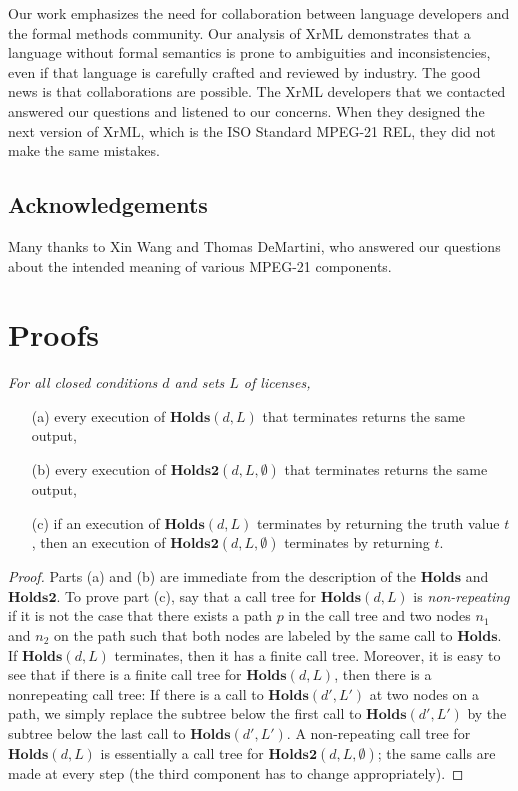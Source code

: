 \documentclass{acmtrans2m}
\newcommand{\prf}{\begin{proof}}
\newcommand{\eprf}{\end{proof}}
\newenvironment{RETHM}[2]{\trivlist \item[\hskip 10pt\hskip\labelsep{\sc #1\hskip 5pt\relax\ref{#2}.}]\it}{\endtrivlist}
\newcommand{\repro}[1]{\begin{RETHM}{Proposition}{#1}}
\newcommand{\erepro}{\end{RETHM}}
\newcommand{\opro}{\repro}
\newcommand{\eopro}{\erepro}
\newcommand{\<}{
}
\renewcommand{\>}{\rangle}
\newcommand{\cd}{d}
\newcommand{\CMet}{\textbf{Holds}}
\newcommand{\CMetTwo}{\textbf{Holds2}}
\begin{document}
Our work emphasizes the need for collaboration
between language developers and
the formal methods community.  Our analysis of XrML demonstrates that a
language without formal semantics is prone to ambiguities and inconsistencies, even if
that language is carefully crafted and reviewed by industry.  The good news is that collaborations
are possible.  The XrML developers that we contacted answered our questions and listened to our
concerns.  When they designed the next version of XrML, which is the ISO Standard MPEG-21 REL,
they did not make the same mistakes.

\subsection*{Acknowledgements}
Many thanks to Xin Wang and Thomas DeMartini, who answered our questions about the intended meaning
of various MPEG-21 components.

\appendix
\section{Proofs}
\opro{t:correct2}
For all closed conditions $\cd$ and sets $L$ of licenses,
\begin{itemize}
\item[(a)] every execution of $\CMet(\cd, L)$ that terminates returns the same output,
\item[(b)] every execution of $\CMetTwo(\cd, L, \emptyset)$ that terminates returns the same output,
\item[(c)] if an execution of $\CMet(\cd, L)$ terminates by returning the truth value $t$, then
an execution of $\CMetTwo(\cd, L, \emptyset)$ terminates by returning $t$.
\end{itemize}
\eopro
\prf
Parts (a) and (b) are immediate from the description of the $\CMet$ and $\CMetTwo$.
To prove part (c), say that a call tree for $\CMet(\cd,L)$ is \emph{non-repeating}
if it is not the case that there exists a path $p$ in the call tree and two nodes
$n_1$ and $n_2$ on the path such that both nodes are labeled by the same call to
$\CMet$.  If $\CMet(\cd, L)$ terminates, then it has a finite call tree.  Moreover,
it is easy to see that if there is a finite call tree for $\CMet(\cd,L)$, then
there is a nonrepeating call tree:  If there is a call to $\CMet(\cd',L')$ at two
nodes on a path, we simply replace the subtree below the first call to
$\CMet(\cd',L')$ by the subtree below the last call to $\CMet(\cd',L')$.  A
non-repeating call tree for $\CMet(\cd, L)$ is essentially a call tree for
$\CMetTwo(\cd, L, \emptyset)$; the same calls are made at every step (the third
component has to change appropriately).
\eprf
\end{document}
